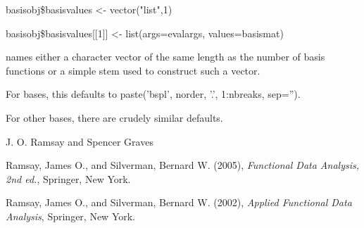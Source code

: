 \begin{Details}
{{basisobj\$basisvalues <- vector("list",1)

basisobj\$basisvalues[[1]] <- list(args=evalargs,
values=basismat)

\item[names] either a character vector of the same length as the number of
basis functions or a simple stem used to construct such a
vector.

For  bases, this defaults to paste('bspl', norder,
'.', 1:nbreaks, sep='').

For other bases, there are crudely similar defaults.

}
}
\end{Details}
\begin{Author}\relax
J. O. Ramsay and Spencer Graves
\end{Author}
\begin{References}\relax
Ramsay, James O., and Silverman, Bernard W. (2005), \emph{Functional
Data Analysis, 2nd ed.}, Springer, New York.

Ramsay, James O., and Silverman, Bernard W. (2002), \emph{Applied
Functional Data Analysis}, Springer, New York.
\end{References}
\begin{SeeAlso}\relax
{}
\end{SeeAlso}

